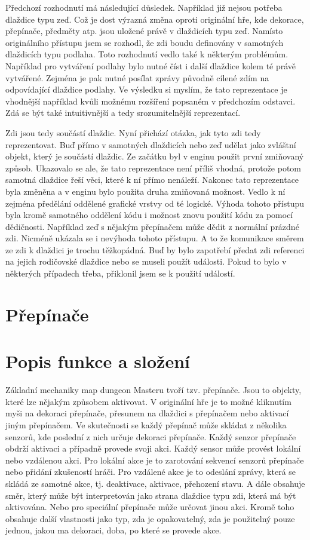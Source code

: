 Předchozí rozhodnutí má následující důsledek. Například již nejsou potřeba dlaždice typu zeď.
Což je dost výrazná změna oproti originální hře, kde dekorace, přepínače, předměty atp. jsou uložené právě v dlaždicích typu zeď.
Namísto originálního přístupu jsem se rozhodl, že zdi boudu definovány v samotných dlaždicích typu podlaha. Toto rozhodnutí vedlo také
k některým problémům. Například pro vytváření podlahy bylo nutné číst i další dlaždice kolem té právě vytvářené. Zejména je pak nutné 
posílat zprávy původně cílené zdím na odpovídající dlaždice podlahy. Ve výsledku si myslím, že tato reprezentace je vhodnější
například kvůli možnému rozšíření popsaném v předchozím odstavci. Zdá se být také intuitivnější a tedy srozumitelnější reprezentací.

Zdi jsou tedy součástí dlaždic. Nyní přichází otázka, jak tyto zdi tedy reprezentovat. Buď přímo v samotných dlaždicích nebo
zeď udělat jako zvláštní objekt, který je součástí dlaždic. Ze začátku byl v enginu použit první zmiňovaný způsob. Ukazovalo se ale, 
že tato reprezentace není příliš vhodná, protože potom samotná dlaždice řeší věci, které k ní přímo nenáleží.
Nakonec tato reprezentace byla změněna a v enginu bylo použita druha zmiňovaná možnost. Vedlo k ní zejména předělání oddělené grafické 
vrstvy od té logické. Výhoda tohoto přístupu byla kromě samotného oddělení kódu i možnost znovu použití kódu za pomocí dědičnosti. 
Například zeď s nějakým přepínačem může dědit z normální prázdné zdi. Nicméně ukázala se i nevýhoda tohoto přístupu. A to že komunikace směrem 
ze zdi k dlaždici je trochu těžkopádná. Buď by bylo zapotřebí předat zdi referenci na jejich rodičovské dlaždice nebo se museli použít události.
Pokud to bylo v některých případech třeba, přiklonil jsem se k použití událostí.

\section{Přepínače}
\section{Popis funkce a složení}
Základní mechaniky map dungeon Masteru tvoří tzv. přepínače. Jsou to objekty, které lze nějakým způsobem aktivovat. V originální
hře je to možné kliknutím myši na dekoraci přepínače, přesunem na dlaždici s přepínačem nebo aktivací jiným přepínačem. Ve 
skutečnosti se každý přepínač může skládat z několika senzorů, kde poslední z nich určuje dekoraci přepínače. Každý senzor přepínače
obdrží aktivaci a případně provede svoji akci. Každý sensor může provést lokální nebo vzdálenou akci. Pro lokální akce je to 
zarotování sekvencí senzorů přepínače nebo přidání zkušeností hráči. Pro vzdálené akce je to odeslání zprávy, která se skládá ze samotné akce, tj.
deaktivace, aktivace, přehození stavu. A dále obsahuje směr, který může být interpretován jako strana dlaždice typu zdi, která má 
být aktivována. Nebo pro speciální přepínače může určovat jinou akci. Kromě toho obsahuje další vlastnosti jako typ, zda je opakovatelný, zda je 
použitelný pouze jednou, jakou ma dekoraci, doba, po které se provede akce.

